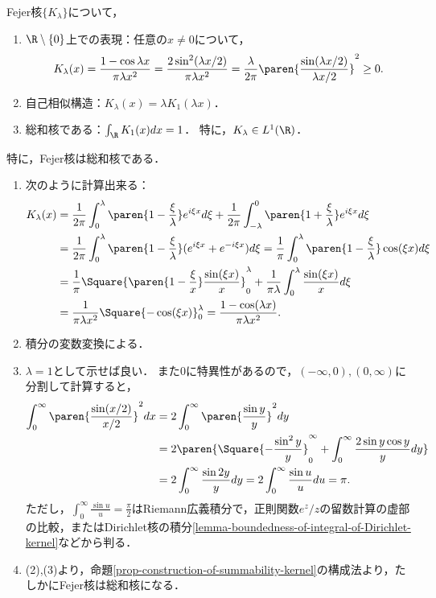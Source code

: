 \documentclass[uplatex,dvipdfmx]{jsreport}
\begin{document}
\begin{proposition}[Fejer核の性質]\label{prop-property-of-Fejer-kernel-on-R1}
    Fejer核$\{K_\lambda\}$について，
    \begin{enumerate}
        \item $\R\setminus\{0\}$上での表現：任意の$x\ne0$について，\[K_\lambda(x)=\frac{1-\cos\lambda x}{\pi\lambda x^2}=\frac{2\sin^2(\lambda x/2)}{\pi\lambda x^2}=\frac{\lambda}{2\pi}\paren{\frac{\sin(\lambda x/2)}{\lambda x/2}}^2\ge0.\]
        \item 自己相似構造：$K_\lambda(x)=\lambda K_1(\lambda x)$．
        \item 総和核である：$\int_\R K_1(x)dx=1$．
        特に，$K_\lambda\in L^1(\R)$．
    \end{enumerate}
    特に，Fejer核は総和核である．
\end{proposition}
\begin{Proof}\mbox{}
    \begin{enumerate}
        \item 次のように計算出来る：
        \begin{align*}
            K_\lambda(x)&=\frac{1}{2\pi}\int^\lambda_0\paren{1-\frac{\xi}{\lambda}}e^{i\xi x}d\xi+\frac{1}{2\pi}\int^0_{-\lambda}\paren{1+\frac{\xi}{\lambda}}e^{i\xi x}d\xi\\
            &=\frac{1}{2\pi}\int^\lambda_0\paren{1-\frac{\xi}{\lambda}}(e^{i\xi x}+e^{-i\xi x})d\xi=\frac{1}{\pi}\int^\lambda_0\paren{1-\frac{\xi}{\lambda}}\cos(\xi x)d\xi\\
            &=\frac{1}{\pi}\Square{\paren{1-\frac{\xi}{x}}\frac{\sin(\xi x)}{x}}^\lambda_0+\frac{1}{\pi\lambda}\int^\lambda_0\frac{\sin(\xi x)}{x}d\xi\\
            &=\frac{1}{\pi\lambda x^2}\Square{-\cos(\xi x)}^\lambda_0=\frac{1-\cos(\lambda x)}{\pi\lambda x^2}.
        \end{align*}
        \item 積分の変数変換による．
        \item $\lambda=1$として示せば良い．
        また$0$に特異性があるので，$(-\infty,0),(0,\infty)$に分割して計算すると，
        \begin{align*}
            \int^\infty_0\paren{\frac{\sin(x/2)}{x/2}}^2dx&=2\int^\infty_0\paren{\frac{\sin y}{y}}^2dy\\
            &=2\paren{\Square{-\frac{\sin^2y}{y}}^\infty_0+\int^\infty_0\frac{2\sin y\cos y}{y}dy}\\
            &=2\int^\infty_0\frac{\sin 2y}{y}dy=2\int^\infty_0\frac{\sin u}{u}du=\pi.
        \end{align*}
        ただし，$\int^\infty_0\frac{\sin u}{u}=\frac{\pi}{2}$はRiemann広義積分で，正則関数$e^z/z$の留数計算の虚部の比較，またはDirichlet核の積分\ref{lemma-boundedness-of-integral-of-Dirichlet-kernel}などから判る．
        \item (2),(3)より，命題\ref{prop-construction-of-summability-kernel}の構成法より，たしかにFejer核は総和核になる．
    \end{enumerate}
\end{Proof}
\end{document}
